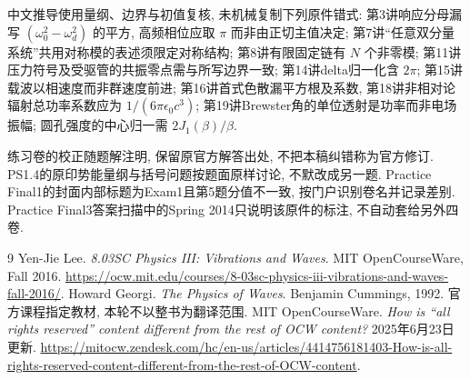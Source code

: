 中文推导使用量纲、边界与初值复核, 未机械复制下列原件错式: 第3讲响应分母漏写 $(\omega_0^2-\omega_d^2)$ 的平方, 高频相位应取 $\pi$ 而非由正切主值决定; 第7讲“任意双分量系统”共用对称模的表述须限定对称结构; 第8讲有限固定链有 $N$ 个非零模; 第11讲压力符号及受驱管的共振零点需与所写边界一致; 第14讲delta归一化含 $2\pi$; 第15讲载波以相速度而非群速度前进; 第16讲首式色散漏平方根及系数, 第18讲非相对论辐射总功率系数应为 $1/(6\pi\epsilon_0c^3)$; 第19讲Brewster角的单位透射是功率而非电场振幅; 圆孔强度的中心归一需 $2J_1(\beta)/\beta$.

练习卷的校正随题解注明, 保留原官方解答出处, 不把本稿纠错称为官方修订. PS1.4的原印势能量纲与括号问题按题面原样讨论, 不默改成另一题. Practice Final1的封面内部标题为Exam1且第5题分值不一致, 按门户识别卷名并记录差别. Practice Final3答案扫描中的Spring 2014只说明该原件的标注, 不自动套给另外四卷.

\begin{thebibliography}{9}
 Yen-Jie Lee. \emph{8.03SC Physics III: Vibrations and Waves}. MIT OpenCourseWare, Fall 2016. \url{https://ocw.mit.edu/courses/8-03sc-physics-iii-vibrations-and-waves-fall-2016/}.
 Howard Georgi. \emph{The Physics of Waves}. Benjamin Cummings, 1992. 官方课程指定教材, 本轮不以整书为翻译范围.
 MIT OpenCourseWare. \emph{How is “all rights reserved” content different from the rest of OCW content?} 2025年6月23日更新. \url{https://mitocw.zendesk.com/hc/en-us/articles/4414756181403-How-is-all-rights-reserved-content-different-from-the-rest-of-OCW-content}.
\end{thebibliography}
